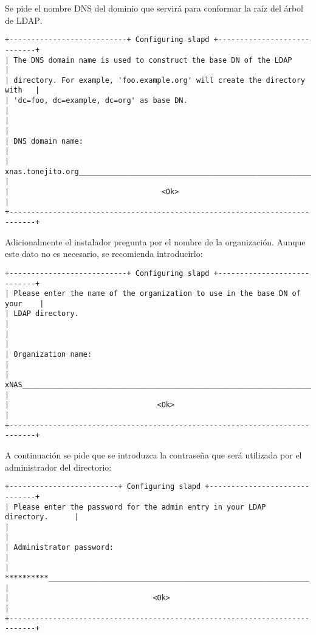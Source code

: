 Se pide el nombre DNS del dominio que servir\'{a} para conformar la ra\'{i}z del \'{a}rbol de \textsc{LDAP}.

{
\scriptsize
\linespread{1}
\begin{verbatim}
+---------------------------+ Configuring slapd +----------------------------+
| The DNS domain name is used to construct the base DN of the LDAP           |
| directory. For example, 'foo.example.org' will create the directory with   |
| 'dc=foo, dc=example, dc=org' as base DN.                                   |
|                                                                            |
| DNS domain name:                                                           |
| xnas.tonejito.org________________________________________________________________ |
|                                   <Ok>                                     |
+----------------------------------------------------------------------------+
\end{verbatim}
}

Adicionalmente el instalador pregunta por el nombre de la organizaci\'{o}n. Aunque este dato no es necesario, se recomienda introducirlo:

{
\scriptsize
\linespread{1}
\begin{verbatim}
+---------------------------+ Configuring slapd +----------------------------+
| Please enter the name of the organization to use in the base DN of your    |
| LDAP directory.                                                            |
|                                                                            |
| Organization name:                                                         |
| xNAS_____________________________________________________________________  |
|                                  <Ok>                                      |
+----------------------------------------------------------------------------+
\end{verbatim}
}

A continuaci\'{o}n se pide que se introduzca la contrase\~{n}a que ser\'{a} utilizada por el administrador del directorio:

{
\scriptsize
\linespread{1}
\begin{verbatim}
+-------------------------+ Configuring slapd +------------------------------+
| Please enter the password for the admin entry in your LDAP directory.      |
|                                                                            |
| Administrator password:                                                    |
| **********____________________________________________________________     |
|                                 <Ok>                                       |
+----------------------------------------------------------------------------+
\end{verbatim}
}


